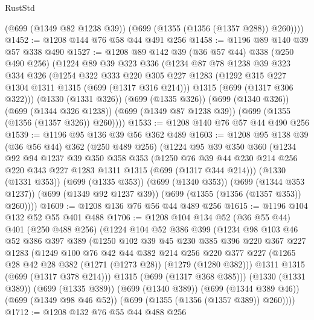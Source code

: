 \begin{lexlean}{RustStd}
\begin{coremodule}
        (@699 (@1349 @82 @1238 @39))
        (@699 (@1355 (@1356 (@1357 @288)) @260))))
@1452 := @1208 @144 @76 @58 @44 @491 @256
@1458 := @1196 @89 @140 @39 @57 @338 @490
@1527 := @1208
    @89
    @142
    @39
    (@36 @57 @44)
    @338
    (@250 @490 @256)
    (@1224
      @89
      @39
      @323
      @336
      (@1234
        @87
        @78
        @1238
        @39
        @323
        @334
        @326
        (@1254
          @322
          @333
          @220
          @305
          @227
          @1283
          (@1292 @315 @227 @1304 @1311 @1315 (@699 (@1317 @316 @214)))
          @1315
          (@699 (@1317 @306 @322)))
        (@1330 (@1331 @326))
        (@699 (@1335 @326))
        (@699 (@1340 @326))
        (@699 (@1344 @326 @1238))
        (@699 (@1349 @87 @1238 @39))
        (@699 (@1355 (@1356 (@1357 @326)) @260))))
@1533 := @1208 @140 @76 @57 @44 @490 @256
@1539 := @1196 @95 @136 @39 @56 @362 @489
@1603 := @1208
    @95
    @138
    @39
    (@36 @56 @44)
    @362
    (@250 @489 @256)
    (@1224
      @95
      @39
      @350
      @360
      (@1234
        @92
        @94
        @1237
        @39
        @350
        @358
        @353
        (@1250 @76 @39 @44 @230 @214 @256 @220 @343 @227 @1283 @1311 @1315 (@699 (@1317 @344 @214)))
        (@1330 (@1331 @353))
        (@699 (@1335 @353))
        (@699 (@1340 @353))
        (@699 (@1344 @353 @1237))
        (@699 (@1349 @92 @1237 @39))
        (@699 (@1355 (@1356 (@1357 @353)) @260))))
@1609 := @1208 @136 @76 @56 @44 @489 @256
@1615 := @1196 @104 @132 @52 @55 @401 @488
@1706 := @1208
    @104
    @134
    @52
    (@36 @55 @44)
    @401
    (@250 @488 @256)
    (@1224
      @104
      @52
      @386
      @399
      (@1234
        @98
        @103
        @46
        @52
        @386
        @397
        @389
        (@1250
          @102
          @39
          @45
          @230
          @385
          @396
          @220
          @367
          @227
          @1283
          (@1249
            @100
            @76
            @42
            @44
            @382
            @214
            @256
            @220
            @377
            @227
            (@1265 @28 @42 @28 @382 (@1271 (@1273 @28)) (@1279 (@1280 @382)))
            @1311
            @1315
            (@699 (@1317 @378 @214)))
          @1315
          (@699 (@1317 @368 @385)))
        (@1330 (@1331 @389))
        (@699 (@1335 @389))
        (@699 (@1340 @389))
        (@699 (@1344 @389 @46))
        (@699 (@1349 @98 @46 @52))
        (@699 (@1355 (@1356 (@1357 @389)) @260))))
@1712 := @1208 @132 @76 @55 @44 @488 @256

\end{coremodule}
\end{lexlean}
